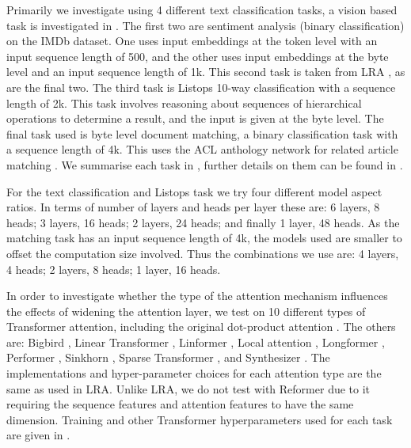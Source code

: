 Primarily we investigate using 4 different text classification tasks, a vision based task is investigated in .
The first two are sentiment analysis (binary classification) on the IMDb dataset.
One uses input embeddings at the token level with an input sequence length of 500, and the other uses input embeddings at the byte level and an input sequence length of 1k.
This second task is taken from LRA \citep{lra}, as are the final two.
The third task is Listops 10-way classification with a sequence length of 2k.
This task involves reasoning about sequences of hierarchical operations to determine a result, and the input is given at the byte level.
The final task used is byte level document matching, a binary classification task with a sequence length of 4k.
This uses the ACL anthology network for related article matching \citep{acl}.
We summarise each task in , further details on them can be found in \citet{lra}.

For the text classification and Listops task we try four different model aspect ratios.
In terms of number of layers and heads per layer these are: 6 layers, 8 heads; 3 layers, 16 heads; 2 layers, 24 heads; and finally 1 layer, 48 heads.
As the matching task has an input sequence length of 4k, the models used are smaller to offset the computation size involved.
Thus the combinations we use are: 4 layers, 4 heads; 2 layers, 8 heads; 1 layer, 16 heads.

In order to investigate whether the type of the attention mechanism influences the effects of widening the attention layer, we test on 10 different types of Transformer attention, including the original dot-product attention \citep{tfm}.
The others are: Bigbird \citep{bigbird}, Linear Transformer \citep{linear_tfm}, Linformer \citep{linformer}, Local attention \citep{local_tfm}, Longformer \citep{longformer}, Performer \citep{performer}, Sinkhorn \citep{sinkhorn}, Sparse Transformer \citep{sparse_tfm}, and Synthesizer \citep{synthesizer}.
The implementations and hyper-parameter choices for each attention type are the same as used in LRA.
Unlike LRA, we do not test with Reformer \citep{reformer} due to it requiring the sequence features and attention features to have the same dimension. Training and other Transformer hyperparameters used for each task are given in .

